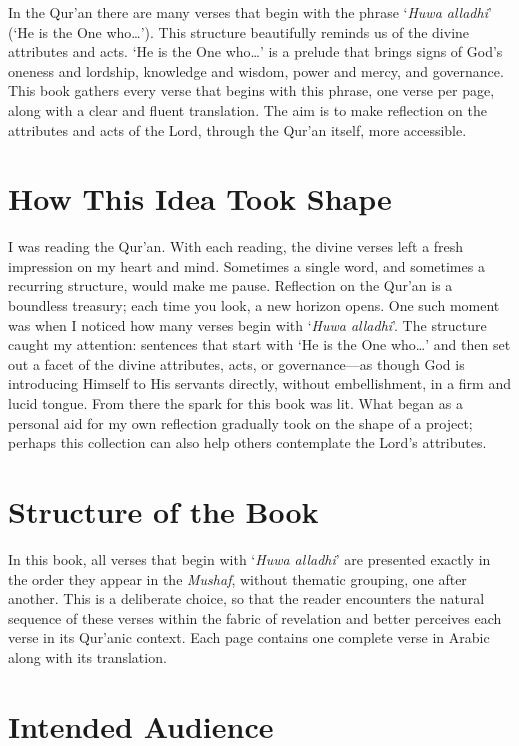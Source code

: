 In the Qur'an there are many verses that begin with the phrase `\textit{Huwa alladhi}' (`He is the One who\ldots'). This structure beautifully reminds us of the divine attributes and acts. `He is the One who\ldots' is a prelude that brings signs of God's oneness and lordship, knowledge and wisdom, power and mercy, and governance. This book gathers every verse that begins with this phrase, one verse per page, along with a clear and fluent translation. The aim is to make reflection on the attributes and acts of the Lord, through the Qur'an itself, more accessible.

\section{How This Idea Took Shape}

I was reading the Qur'an. With each reading, the divine verses left a fresh impression on my heart and mind. Sometimes a single word, and sometimes a recurring structure, would make me pause. Reflection on the Qur'an is a boundless treasury; each time you look, a new horizon opens. One such moment was when I noticed how many verses begin with `\textit{Huwa alladhi}'. The structure caught my attention: sentences that start with `He is the One who\ldots' and then set out a facet of the divine attributes, acts, or governance---as though God is introducing Himself to His servants directly, without embellishment, in a firm and lucid tongue. From there the spark for this book was lit. What began as a personal aid for my own reflection gradually took on the shape of a project; perhaps this collection can also help others contemplate the Lord's attributes.

\section{Structure of the Book}

In this book, all verses that begin with `\textit{Huwa alladhi}' are presented exactly in the order they appear in the \textit{Mushaf}, without thematic grouping, one after another. This is a deliberate choice, so that the reader encounters the natural sequence of these verses within the fabric of revelation and better perceives each verse in its Qur'anic context. Each page contains one complete verse in Arabic along with its translation.

\section{Intended Audience}

